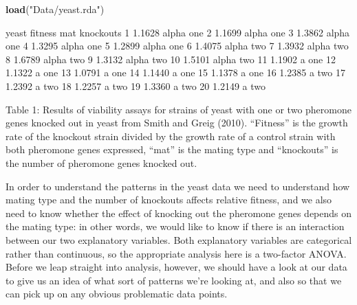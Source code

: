 \documentclass[
]{book}
\newenvironment{Shaded}{\begin{snugshade}}{\end{snugshade}}
\newcommand{\DecValTok}[1]{\textcolor[rgb]{0.00,0.00,0.81}{#1}}
\newcommand{\FloatTok}[1]{\textcolor[rgb]{0.00,0.00,0.81}{#1}}
\newcommand{\KeywordTok}[1]{\textcolor[rgb]{0.13,0.29,0.53}{\textbf{#1}}}
\newcommand{\NormalTok}[1]{#1}
\newcommand{\StringTok}[1]{\textcolor[rgb]{0.31,0.60,0.02}{#1}}
\begin{document}
\begin{Shaded}
\begin{Highlighting}[]
\KeywordTok{load}\NormalTok{(}\StringTok{"Data/yeast.rda"}\NormalTok{)}

\NormalTok{yeast}
\NormalTok{   fitness   mat knockouts}
\DecValTok{1}   \FloatTok{1.1628}\NormalTok{ alpha       one}
\DecValTok{2}   \FloatTok{1.1699}\NormalTok{ alpha       one}
\DecValTok{3}   \FloatTok{1.3862}\NormalTok{ alpha       one}
\DecValTok{4}   \FloatTok{1.3295}\NormalTok{ alpha       one}
\DecValTok{5}   \FloatTok{1.2899}\NormalTok{ alpha       one}
\DecValTok{6}   \FloatTok{1.4075}\NormalTok{ alpha       two}
\DecValTok{7}   \FloatTok{1.3932}\NormalTok{ alpha       two}
\DecValTok{8}   \FloatTok{1.6789}\NormalTok{ alpha       two}
\DecValTok{9}   \FloatTok{1.3132}\NormalTok{ alpha       two}
\DecValTok{10}  \FloatTok{1.5101}\NormalTok{ alpha       two}
\DecValTok{11}  \FloatTok{1.1902}\NormalTok{     a       one}
\DecValTok{12}  \FloatTok{1.1322}\NormalTok{     a       one}
\DecValTok{13}  \FloatTok{1.0791}\NormalTok{     a       one}
\DecValTok{14}  \FloatTok{1.1440}\NormalTok{     a       one}
\DecValTok{15}  \FloatTok{1.1378}\NormalTok{     a       one}
\DecValTok{16}  \FloatTok{1.2385}\NormalTok{     a       two}
\DecValTok{17}  \FloatTok{1.2392}\NormalTok{     a       two}
\DecValTok{18}  \FloatTok{1.2257}\NormalTok{     a       two}
\DecValTok{19}  \FloatTok{1.3360}\NormalTok{     a       two}
\DecValTok{20}  \FloatTok{1.2149}\NormalTok{     a       two}
\end{Highlighting}
\end{Shaded}

Table 1: Results of viability assays for strains of yeast with one or two pheromone genes knocked out in yeast from Smith and Greig (2010). ``Fitness'' is the growth rate of the knockout strain divided by the growth rate of a control strain with both pheromone genes expressed, ``mat'' is the mating type and ``knockouts'' is the number of pheromone genes knocked out.

In order to understand the patterns in the yeast data we need to understand how mating type and the number of knockouts affects relative fitness, and we also need to know whether the effect of knocking out the pheromone genes depends on the mating type: in other words, we would like to know if there is an interaction between our two explanatory variables. Both explanatory variables are categorical rather than continuous, so the appropriate analysis here is a two-factor ANOVA. Before we leap straight into analysis, however, we should have a look at our data to give us an idea of what sort of patterns we're looking at, and also so that we can pick up on any obvious problematic data points.
\end{document}
